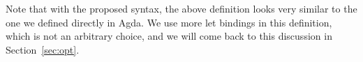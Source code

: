 \begin{code}
\AgdaSymbol{=}\AgdaSpace{}%
\AgdaSpace{}%
\AgdaSpace{}%
\AgdaInductiveConstructor{[]}\AgdaSymbol{\}}\AgdaSpace{}%
\AgdaSpace{}%
\AgdaSpace{}%
\AgdaSpace{}%
\AgdaSpace{}%
\AgdaSpace{}%
\AgdaSpace{}%
\AgdaSymbol{(}\AgdaSpace{}%
\AgdaSpace{}%
\AgdaSymbol{))}\AgdaSpace{}%
\<%
\\
%
\>[8]\AgdaSpace{}%
\AgdaSpace{}%
\AgdaFunction{:=}\AgdaSpace{}%
\AgdaSpace{}%
\AgdaSpace{}%
\AgdaSpace{}%
\AgdaSpace{}%
\<%
\\
%
\>[8]\AgdaSpace{}%
%
\>[16]\AgdaFunction{:=}\AgdaSpace{}%
\AgdaSpace{}%
\AgdaSpace{}%
\<%
\\
%
\>[8]\AgdaSpace{}%
%
\>[16]\AgdaFunction{:=}\AgdaSpace{}%
\AgdaSymbol{(}\AgdaSpace{}%
\AgdaSymbol{\{}\AgdaSpace{}%
\AgdaSymbol{=}\AgdaSpace{}%
\AgdaSpace{}%
\AgdaSpace{}%
\AgdaSpace{}%
\AgdaSpace{}%
\AgdaInductiveConstructor{[]}\AgdaSymbol{\}}\AgdaSpace{}%
\AgdaSpace{}%
\AgdaSpace{}%
\AgdaSpace{}%
\AgdaSpace{}%
\AgdaSpace{}%
\AgdaSpace{}%
\AgdaSymbol{(}\AgdaSpace{}%
\AgdaSpace{}%
\AgdaSymbol{))}\AgdaSpace{}%
\<%
\\
%
\>[8]\AgdaSpace{}%
%
\>[16]\AgdaFunction{:=}\AgdaSpace{}%
\AgdaSpace{}%
\AgdaSpace{}%
\AgdaSpace{}%
\AgdaSpace{}%
\<%
\\
%
\>[8]\AgdaSpace{}%
%
\>[16]\AgdaFunction{:=}\AgdaSpace{}%
\AgdaSpace{}%
\AgdaSpace{}%
\<%
\\
%
\>[8]\AgdaSpace{}%
%
\>[16]\AgdaFunction{:=}\AgdaSpace{}%
\AgdaSpace{}%
\AgdaSpace{}%
\AgdaSpace{}%
\<%
\\
%
\>[8]\<%
\end{code}
Note that with the proposed syntax, the above definition looks very similar
to the one we defined directly in Agda.  We use more let bindings in this
definition, which is not an arbitrary choice, and we will come back to this
discussion in Section~\ref{sec:opt}.

